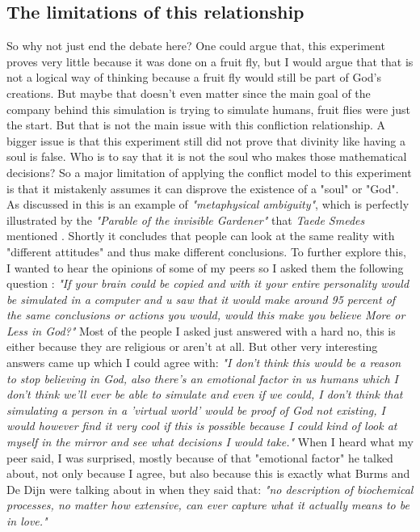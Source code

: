 \documentclass[a4paper,12pt,twoside]{report}
\begin{document}
\subsection{The limitations of this relationship}
So why not just end the debate here? 
One could argue that, this experiment proves very little because it was done on a fruit fly, 
but I would argue that that is not a logical way of thinking because a fruit fly would still be part of God's creations. 
But maybe that doesn't even matter since the main goal of the company behind this simulation \cite{turkiyetoday2026fruitfly} is trying to simulate humans, 
fruit flies were just the start. But that is not the main issue with this confliction relationship. 
A bigger issue is that this experiment still did not prove that divinity like having a soul is false. 
Who is to say that it is not the soul who makes those mathematical decisions? 
So a major limitation of applying the conflict model to this experiment is that it mistakenly assumes it can disprove the existence of a "soul" or "God".
As discussed in \cite[Chapter 4, p. 192]{depoortere2023living} this is an example of \textit{"metaphysical ambiguity"}, 
which is perfectly illustrated by the \textit{"Parable of the invisible Gardener"} that \textit{Taede Smedes} mentioned \cite[Chapter 4, p. 186]{depoortere2023living}.
Shortly it concludes that people can look at the same reality with "different attitudes" and thus make different conclusions.
To further explore this, I wanted to hear the opinions of some of my peers so I asked them the following question : 
\newline
\newline
\textit{"If your brain could be copied and with it your entire personality would be simulated in a computer and u saw that it would make around 95 percent of the same conclusions or actions you would, would this make you believe More or Less in God?"}
\newline
\newline
Most of the people I asked just answered with a hard no, this is either because they are religious or aren't at all.
But other very interesting answers came up which I could agree with:
\newline
\newline
\textit{"I don't think this would be a reason to stop believing in God, also there's an emotional factor in us humans which I don't think we'll ever be able to simulate and even if we could, I don't think that simulating a person in a 'virtual world' would be proof of God not existing, I would however find it very cool if this is possible because I could kind of look at myself in the mirror and see what decisions I would take."}
\newline
\newline
When I heard what my peer said, I was surprised, mostly because of that "emotional factor" he talked about, not only because I agree, but also because this is exactly what Burms and De Dijn were talking about in \cite[Chapter 3, p. 84-90]{depoortere2023living} when they said that: \textit{"no description of biochemical processes, no matter how extensive, can ever capture what it actually means to be in love."}
\newpage
\end{document}
